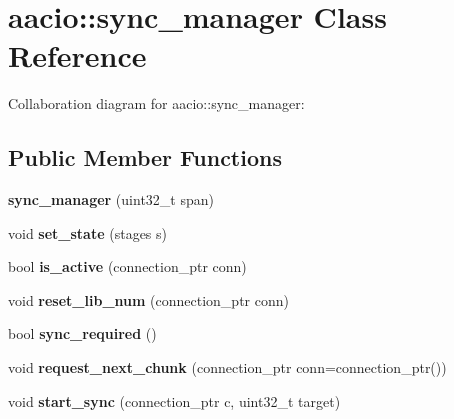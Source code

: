 \hypertarget{classaacio_1_1sync__manager}{}\section{aacio\+:\+:sync\+\_\+manager Class Reference}
\label{classaacio_1_1sync__manager}


Collaboration diagram for aacio\+:\+:sync\+\_\+manager\+:
\subsection*{Public Member Functions}
\begin{DoxyCompactItemize}
\item 
\mbox{\label{classaacio_1_1sync__manager_ac937ef8291bda86c14057223e61a9717}} 
{\bfseries sync\+\_\+manager} (uint32\+\_\+t span)
\item 
\mbox{\label{classaacio_1_1sync__manager_a8d1749f777288c9e7fefcac0ed5957cf}} 
void {\bfseries set\+\_\+state} (stages s)
\item 
\mbox{\label{classaacio_1_1sync__manager_af8fc6738ff35b77ffddce2388b8ff519}} 
bool {\bfseries is\+\_\+active} (connection\+\_\+ptr conn)
\item 
\mbox{\label{classaacio_1_1sync__manager_a4da69da1a21cde1f4e38935d89eb407c}} 
void {\bfseries reset\+\_\+lib\+\_\+num} (connection\+\_\+ptr conn)
\item 
\mbox{\label{classaacio_1_1sync__manager_a6523b5f01322f5f9522b527b541bf929}} 
bool {\bfseries sync\+\_\+required} ()
\item 
\mbox{\label{classaacio_1_1sync__manager_af976350628a51cb5774dd474a8885f2e}} 
void {\bfseries request\+\_\+next\+\_\+chunk} (connection\+\_\+ptr conn=connection\+\_\+ptr())
\item 
\mbox{\label{classaacio_1_1sync__manager_ad3f0ebfbaeb303667db067898e228323}} 
void {\bfseries start\+\_\+sync} (connection\+\_\+ptr c, uint32\+\_\+t target)
\item 

\end{DoxyCompactItemize}
